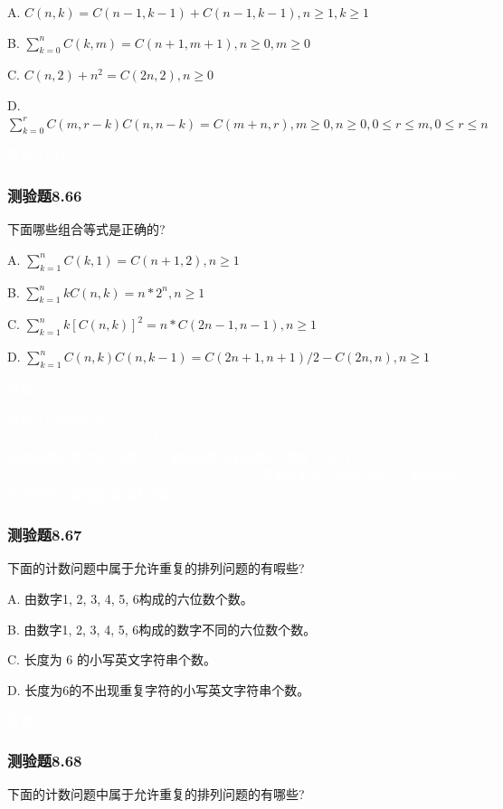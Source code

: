 \documentclass[UTF8, heading=true]{ctexart}
\begin{document}
A. $C(n, k)=C(n-1, k-1)+C(n-1, k-1),  n \geq 1, k \geq 1$

B. $ \sum_{k=0}^n C(k, m)=C(n+1, m+1),  n \geq 0, m \geq 0$

C. $C(n, 2)+n^2=C(2 n, 2),  n \geq 0$

D. $ \sum_{k=0}^r C(m, r-k) C(n, n-k)=C(m+n, r), m \geq 0, n \geq 0,0 \leq r \leq m, 0 \leq r \leq n$

\textcolor{white}{答案：BD}

\subsubsection{测验题8.66}

下面哪些组合等式是正确的?

A. $ \sum_{k=1}^n C(k, 1)=C(n+1,2), n \geq 1$

B. $\sum_{k=1}^n k C(n, k)=n * 2^n, n \geq 1$

C. $ \sum_{k=1}^n k[C(n, k)]^2=n * C(2 n-1, n-1), n \geq 1$

D. $ \sum_{k=1}^n C(n, k) C(n, k-1)=C(2 n+1, n+1) / 2-C(2 n, n), n \geq 1$

\textcolor{white}{答案：AC}

\textcolor{white}{解析：D选项应为$ \sum_{k=1}^n C(n, k) C(n, k-1)=C(2 n+1, n+1)-C(2 n, n) = C(2n,n+1), n \geq 1$
详细证明见课本\textit{练习题8.33}（要注意练习题的题干写错了,应为$\sum_{k=1}^n\binom{n}{k}\binom{n}{k-1}=\binom{2 n+2}{n+1} / 2-\binom{2 n}{n}$。课本写的与D选项一致。正确的式子和证明可以直接查看课本答案。）}

\subsubsection{测验题8.67}

下面的计数问题中属于允许重复的排列问题的有㗇些?

A. 由数字1, 2, 3, 4, 5, 6构成的六位数个数。

B. 由数字1, 2, 3, 4, 5, 6构成的数字不同的六位数个数。

C. 长度为 6 的小写英文字符串个数。

D. 长度为6的不出现重复字符的小写英文字符串个数。

\textcolor{white}{答案：AC}


\subsubsection{测验题8.68}

下面的计数问题中属于允许重复的排列问题的有哪些?
\end{document}
